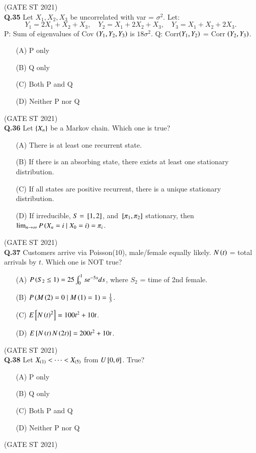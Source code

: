 \documentclass[journal,12pt,onecolumn]{IEEEtran}
\theoremstyle{remark}
\begin{document}
\hfill (GATE ST 2021) \\
\textbf{Q.35}
Let $X_1, X_2, X_3$ be uncorrelated with var = $\sigma^2$. Let:
\[
Y_1 = 2X_1 + X_2 + X_3,\quad Y_2 = X_1 + 2X_2 + X_3,\quad Y_3 = X_1 + X_2 + 2X_3.
\]
P: Sum of eigenvalues of Cov $\left(Y_1,Y_2,Y_3\right)$ is $18\sigma^2$.  
Q: Corr$\left(Y_1,Y_2\right)$ = Corr $\left(Y_2,Y_3\right)$.
\begin{enumerate}
\item[(A)] P only
\item[(B)] Q only
\item[(C)] Both P and Q
\item[(D)] Neither P nor Q
\end{enumerate}

\hfill (GATE ST 2021) \\


\textbf{Q.36}
Let $\left\{X_n\right\}$ be a Markov chain. Which one is true?
\begin{enumerate}
\item[(A)] There is at least one recurrent state.
\item[(B)] If there is an absorbing state, there exists at least one stationary distribution.
\item[(C)] If all states are positive recurrent, there is a unique stationary distribution.
\item[(D)] If irreducible, $S = {}\left[1,2\right]$, and ${}\left[\pi_1,\pi_2\right]$ stationary, then $\lim_{n\to\infty} P\left(X_n=i \mid X_0=i\right) = \pi_i$.
\end{enumerate}

\hfill (GATE ST 2021) \\

\textbf{Q.37}
Customers arrive via Poisson($10$), male/female equally likely. $N\left(t\right)$ = total arrivals by $t$. Which one is NOT true?
\begin{enumerate}
\item[(A)] $P\left(S_2 \le 1\right) = 25 \int_0^1 s e^{-5s} ds$, where $S_2$ = time of 2nd female.
\item[(B)] $P\left(M\left(2\right) = 0 \mid M\left(1\right) = 1\right) = \frac13$.
\item[(C)] $E{}\left[N\left(t\right)^2\right]= 100t^2 + 10t$.
\item[(D)] $E{}\left[N\left(t\right)N\left(2t\right)\right] = 200t^2 + 10t$.
\end{enumerate}
\hfill (GATE ST 2021) \\

\textbf{Q.38}
Let $X_{\left(1\right)} < \dots < X_{\left(5\right)}$ from $U{}\left[0,\theta\right]$. True?
\begin{enumerate}
\item[(A)] P only
\item[(B)] Q only
\item[(C)] Both P and Q
\item[(D)] Neither P nor Q
\end{enumerate}
\hfill (GATE ST 2021) \\
\end{document}
